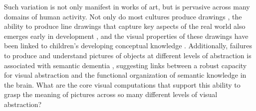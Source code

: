 \documentclass[10pt,letterpaper]{article}
\begin{document}
Such variation is not only manifest in works of art, but is pervasive across many domains of human activity. 
Not only do most cultures produce drawings \cite{gombrich1995story}, the ability to produce line drawings that capture key aspects of the real world also emerges early in development \cite{karmiloff1990constraints, dillon2021rooms, long2021parallel}, and the visual properties of these drawings have been linked to children's developing conceptual knowledge \cite{tversky1989parts,huey2022developmental}. 
Additionally, failures to produce and understand pictures of objects at different levels of abstraction is associated with semantic dementia \cite{bozeat2003duck, rogers2007object}, suggesting links between a robust capacity for visual abstraction and the functional organization of semantic knowledge in the brain. 
What are the core visual computations that support this ability to grasp the meaning of pictures across so many different levels of visual abstraction? 

\end{document}
